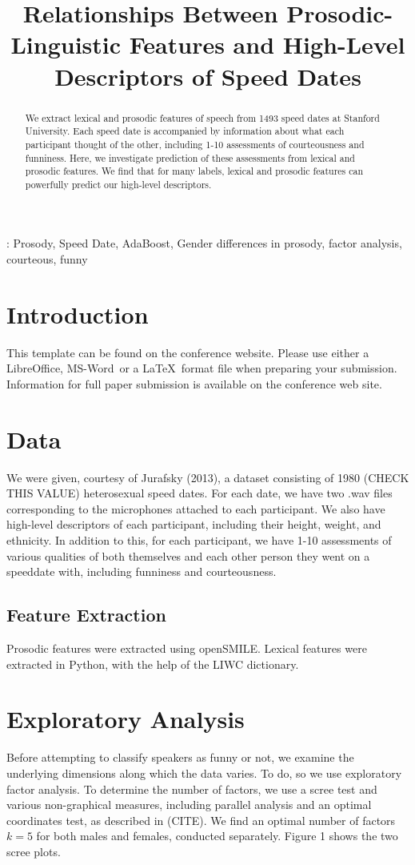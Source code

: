 \documentclass[a4paper]{article}
\title{Relationships Between Prosodic-Linguistic Features and High-Level Descriptors of Speed Dates}
\def\reg{{\rm\ooalign{\hfil
     \raise.07ex\hbox{\scriptsize R}\hfil\crcr\mathhexbox20D}}}
\begin{document}
\maketitle
%

\begin{abstract}
We extract lexical and prosodic features of speech from 1493 speed dates at Stanford University.  Each speed date is accompanied by information about what each participant thought of the other, including 1-10 assessments of courteousness and funniness.  Here, we investigate prediction of these assessments from lexical and prosodic features.  We find that for many labels, lexical and prosodic features can powerfully predict our high-level descriptors.
\end{abstract}

: Prosody, Speed Date, AdaBoost, Gender differences in prosody, factor analysis, courteous, funny

%

\section{Introduction}
This template can be found on the conference website. Please use
either a LibreOffice, MS-Word\reg\ or a \LaTeX\ format file when preparing your
submission. Information for full paper submission is available on the
conference web site.

\section{Data}
We were given, courtesy of Jurafsky (2013), a dataset consisting of 1980 (CHECK THIS VALUE) heterosexual speed dates. For each date, we have two .wav files corresponding to the microphones attached to each participant.  We also have high-level descriptors of each participant, including their height, weight, and ethnicity.  In addition to this, for each participant, we have 1-10 assessments of various qualities of both themselves and each other person they went on a speeddate with, including funniness and courteousness.

\subsection{Feature Extraction}
Prosodic features were extracted using openSMILE.  Lexical features were extracted in Python, with the help of the LIWC dictionary.  

\section{Exploratory Analysis}
Before attempting to classify speakers as funny or not, we examine the underlying dimensions along which the data varies.  To do, so we use exploratory factor analysis. To determine the number of factors, we use a scree test and various non-graphical measures, including parallel analysis and an optimal coordinates test, as described in (CITE).  We find an optimal number of factors $k = 5$ for both males and females, conducted separately.  Figure 1 shows the two scree plots.
\end{document}
